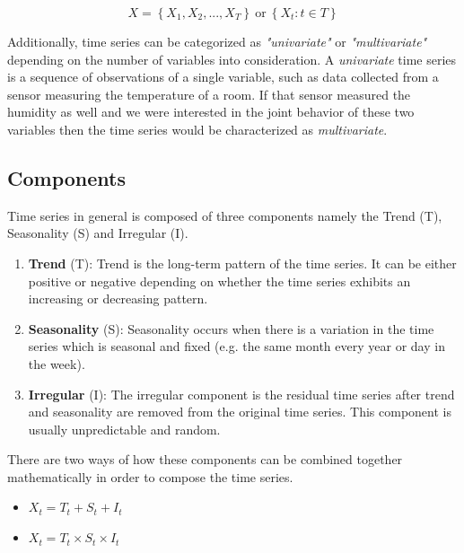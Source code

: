 \documentclass[a4paper, 12pt]{article}
\numberwithin{equation}{section}
\numberwithin{figure}{section}
\numberwithin{table}{section}
\begin{document}
	\begin{equation*}
		X = \left \{ X_1, X_2, ... , X_T \right\} \ \text{or} \  \left \{ X_t: t \in T\right\}
	\end{equation*}
	
	Additionally, time series can be categorized as \textit{"univariate"} or \textit{"multivariate"} depending on the number of variables into consideration. A \textit{univariate} time series  is a sequence of observations of a single variable, such as data collected from a sensor measuring the temperature of a room. If that sensor measured the humidity as well and we were interested in the joint behavior of these two variables then the time series would be characterized as \textit{multivariate}.
	

	\subsection{Components}
	Time series in general is composed of three components namely the Trend (T), Seasonality (S) and Irregular (I).
	
	\begin{enumerate}
		\item \textbf{Trend} (T): Trend is the long-term pattern of the time series. It can be either positive or negative depending on whether the time series exhibits an increasing or decreasing pattern.
		
		\item \textbf{Seasonality} (S): Seasonality occurs when there is a variation in the time series which is seasonal and fixed (e.g. the same month every year or day in the week).
		
		\item \textbf{Irregular} (I): The irregular component is the residual time series after trend and seasonality are removed from the original time series. This component is usually unpredictable and random.
	\end{enumerate}

	There are two ways of how these components can be combined together mathematically in order to compose the time series.
	
	\begin{itemize}
		\item { $ X_t = T_t + S_t + I_t $}
		\item { $ X_t = T_t \times S_t \times I_t $}
	\end{itemize}
	
\end{document}
